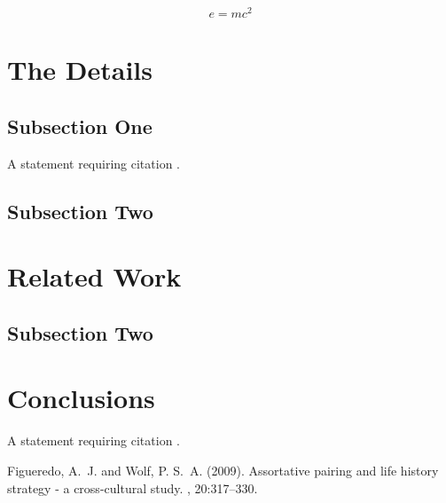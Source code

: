 \documentclass[twoside,twocolumn]{article}
\begin{document}
\blindtext %

\begin{equation}
\label{eq:emc}
e = mc^2
\end{equation}

\blindtext %


\section{The Details}

\subsection{Subsection One}

A statement requiring citation \cite{Figueredo:2009dg}.
\blindtext %

\subsection{Subsection Two}

\blindtext %


\section{Related Work}


\subsection{Subsection Two}

\blindtext %


\section{Conclusions}

A statement requiring citation \cite{Figueredo:2009dg}.
\blindtext %



\begin{thebibliography}{99} %

Figueredo, A.~J. and Wolf, P. S.~A. (2009).
\newblock Assortative pairing and life history strategy - a cross-cultural
  study.
, 20:317--330.
 
\end{thebibliography}

\end{document}

